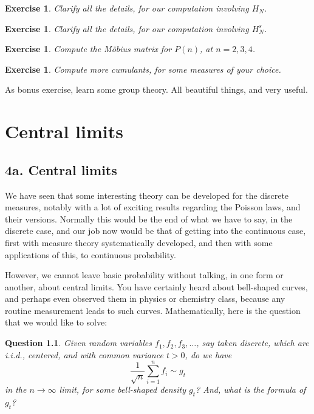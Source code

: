 \documentclass[12pt]{amsbook}
\newtheorem{exercise}[theorem]{Exercise}
\newtheorem{question}[theorem]{Question}
\begin{document}
\begin{exercise}
Clarify all the details, for our computation involving $H_N$.
\end{exercise}

\begin{exercise}
Clarify all the details, for our computation involving $H_N^s$.
\end{exercise}

\begin{exercise}
Compute the M\"obius matrix for $P(n)$, at $n=2,3,4$.
\end{exercise}

\begin{exercise}
Compute more cumulants, for some measures of your choice.
\end{exercise}

As bonus exercise, learn some group theory. All beautiful things, and very useful.

\chapter{Central limits}

\section*{4a. Central limits}

We have seen that some interesting theory can be developed for the discrete measures, notably with a lot of exciting results regarding the Poisson laws, and their versions. Normally this would be the end of what we have to say, in the discrete case, and our job now would be that of getting into the continuous case, first with measure theory systematically developed, and then with some applications of this, to continuous probability.

\bigskip

However, we cannot leave basic probability without talking, in one form or another, about central limits. You have certainly heard about bell-shaped curves, and perhaps even observed them in physics or chemistry class, because any routine measurement leads to such curves. Mathematically, here is the question that we would like to solve:


\begin{question}
Given random variables $f_1,f_2,f_3,\ldots$, say taken discrete, which are i.i.d., centered, and with common variance $t>0$, do we have
$$\frac{1}{\sqrt{n}}\sum_{i=1}^nf_i\sim g_t$$
in the $n\to\infty$ limit, for some bell-shaped density $g_t$? And, what is the formula of $g_t$? 
\end{question}
\end{document}
